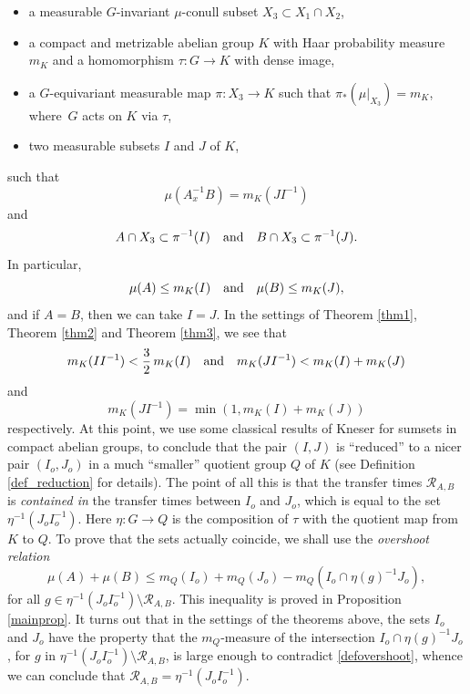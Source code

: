 \documentclass[JEP,XML,SOM,Unicode]{cedram}
\let\mathcal\mathscr
\newcommand{\cR}{\mathcal{R}}
\newcommand{\qand}{\quad\textup{and}\quad}
\theoremstyle{plain}
\theoremstyle{definition}
\begin{document}
\begin{itemize}
\item a measurable $G$-invariant $\mu$-conull subset $X_3 \subset X_1 \cap X_2$,

\item a compact and metrizable abelian group $K$ with Haar probability measure $m_K$ and
a homomorphism $\tau : G \to K$ with dense image,

\item a $G$-equivariant measurable map $\pi : X_3 \to K$ such that $\pi_*(\mu |_{X_3}) = m_K$, where~$G$ acts on $K$ via $\tau$,

\item two measurable subsets $I$ and $J$ of $K$,
\end{itemize}
such that
\[
\mu(A_x^{-1}B) = m_K(JI^{-1})
\]
and
\[
A \cap X_3 \subset \pi^{-1}(I) \qand B \cap X_3 \subset \pi^{-1}(J).
\]
In particular,
\[
\mu(A) \leq m_K(I) \qand \mu(B) \leq m_K(J),
\]
and if $A = B$, then we can take $I = J$. In the settings of Theorem \ref{thm1}, Theorem \ref{thm2} and Theorem \ref{thm3}, we see that
\[
m_K(I I^{-1}) < \frac{3}{2}\, m_K(I)
\qand
m_K(JI^{-1}) < m_K(I) + m_K(J)
\]
and
\[
m_K(J I^{-1}) = \min(1,m_K(I) + m_K(J))
\]
respectively. At this point, we use some classical results \cite{Kneser} of Kneser for sumsets in compact abelian groups,
to conclude that the pair $(I,J)$ is ``reduced'' to a nicer pair $(I_o,J_o)$ in a much ``smaller'' quotient group $Q$ of $K$ (see
Definition \ref{def_reduction} for details). The point of all this is that the transfer times $\cR_{A,B}$ is \emph{contained in} the
transfer times between $I_o$ and $J_o$, which is equal to the set $\eta^{-1}(J_oI_o^{-1})$. Here $\eta : G \to Q$ is the composition
of $\tau$ with the quotient map from $K$ to $Q$. To prove that the sets actually coincide,
we shall use the \emph{overshoot relation}
\begin{equation}
\label{defovershoot}
\mu(A) + \mu(B) \leq m_Q(I_o) + m_Q(J_o) - m_Q(I_o \cap \eta(g)^{-1}J_o),
\end{equation}
for all $g \in \eta^{-1}(J_o I_o^{-1}) \setminus \cR_{A,B}$. This inequality is proved in Proposition \ref{mainprop}. It turns out that in
the settings of the theorems above, the sets $I_o$ and $J_o$ have the property that the $m_Q$-measure of the
intersection $I_o \cap \eta(g)^{-1}J_o$, for $g$ in $\eta^{-1}(J_o I_o^{-1}) \setminus \cR_{A,B}$, is large enough to
contradict \eqref{defovershoot}, whence we can conclude that $\cR_{A,B} = \eta^{-1}(J_o I_o^{-1})$.
\end{document}
